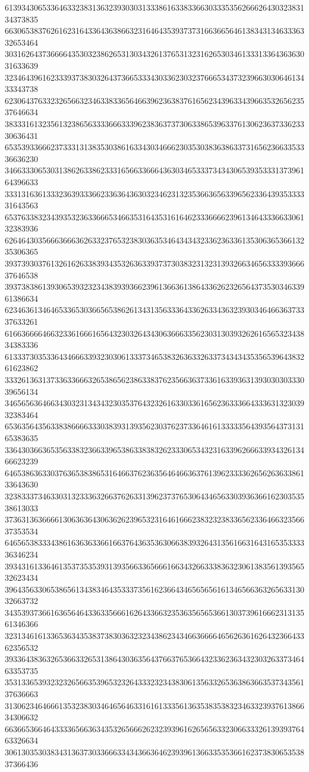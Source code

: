 61393430653364633238313632393030313338616338336630333535626662643032383134373835
66306538376261623164336436386632316464353937373166366564613834313463336332653464
30316264373666643530323862653130343261376531323162653034613331336436363031633639
32346439616233393738303264373665333430336230323766653437323966303064613433343738
62306437633232656632346338336564663962363837616562343963343966353265623537646634
38333161323561323865633336663339623836373730633865396337613062363733623330636431
65353933666237333131383530386163343034666230353038363863373165623663353336636230
34663330653031386263386233316566336664363034653337343430653935333137396164396633
33313163613332363933366233636436303234623132353663656339656233643935333331643563
65376338323439353236336665346635316435316164623336666239613464333663306132383936
62646430356663666362633237653238303635346434343233623633613530636536613235306365
39373930376132616263383934353263633937373038323132313932663465633339366637646538
39373838613930653932323438393936623961366361386433626232656437353034633961386634
62346361346465336530366565386261343135633364336263343632393034646636373337633261
61663666646632336166616564323032643430636663356230313039326261656532343834383336
61333730353364346663393230306133373465383263633263373434343535653964383261623862
33326136313733633666326538656238633837623566363733616339363139303030333039656134
34656563646634303231343432303537643232616330336165623633366433363132303932383464
65363564356338386666333038393139356230376237336461613333356439356437313165383635
33643036636535633832366339653863383832623330653432316339626663393432613466623239
64653863633037636538386531646637623635646466363761396233336265626363386133643630
32383337346330313233363266376263313962373765306434656330393636616230353538613033
37363136366661306363643063626239653231646166623832323833656233646632356637353534
64656538333438616363633661663764363536306638393264313561663164316535333336346234
39343161336461353735353931393566336566616634326633383632306138356139356532623434
39643563306538656134383464353337356162366434656565616134656636326563313032663732
34353937366163656464336335666162643366323536356565366130373961666231313561346366
32313461613365363435383738303632323438623434663666646562636162643236643362356532
39336438363265366332653138643036356437663765366432336236343230326337346463353735
35313365393232326566353965323264333232343830613563326536386366353734356137636663
31306234646661353238303464656463316161333561363538353832346332393761386634306632
66366536646433336566363435326566626232393961626565633230663332613939376463326634
30613035303834313637303366633434366364623939613663353536616237383065353837366436
